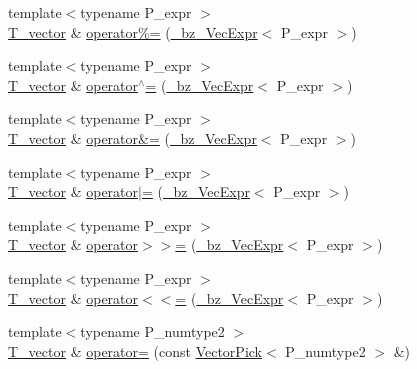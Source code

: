 \begin{DoxyCompactItemize}
{\footnotesize template$<$typename P\+\_\+expr $>$ }\\\hyperlink{classTinyVector_aea08e4463006acf6842a93c026b27094}{T\+\_\+vector} \& \hyperlink{classTinyVector_a82fe1f52954a646fb4c9a93dd740a346}{operator\%=} (\hyperlink{class__bz__VecExpr}{\+\_\+bz\+\_\+\+Vec\+Expr}$<$ P\+\_\+expr $>$)
\item 
{\footnotesize template$<$typename P\+\_\+expr $>$ }\\\hyperlink{classTinyVector_aea08e4463006acf6842a93c026b27094}{T\+\_\+vector} \& \hyperlink{classTinyVector_a3955f3ea3bf925d98a11848d46364283}{operator$^\wedge$=} (\hyperlink{class__bz__VecExpr}{\+\_\+bz\+\_\+\+Vec\+Expr}$<$ P\+\_\+expr $>$)
\item 
{\footnotesize template$<$typename P\+\_\+expr $>$ }\\\hyperlink{classTinyVector_aea08e4463006acf6842a93c026b27094}{T\+\_\+vector} \& \hyperlink{classTinyVector_a2b37419012fb9e2fe50d61363325c5ac}{operator\&=} (\hyperlink{class__bz__VecExpr}{\+\_\+bz\+\_\+\+Vec\+Expr}$<$ P\+\_\+expr $>$)
\item 
{\footnotesize template$<$typename P\+\_\+expr $>$ }\\\hyperlink{classTinyVector_aea08e4463006acf6842a93c026b27094}{T\+\_\+vector} \& \hyperlink{classTinyVector_aa39697b80db3a814bd4909d9cc67901d}{operator$\vert$=} (\hyperlink{class__bz__VecExpr}{\+\_\+bz\+\_\+\+Vec\+Expr}$<$ P\+\_\+expr $>$)
\item 
{\footnotesize template$<$typename P\+\_\+expr $>$ }\\\hyperlink{classTinyVector_aea08e4463006acf6842a93c026b27094}{T\+\_\+vector} \& \hyperlink{classTinyVector_a7da7a52109e9c05b3a5231c67e234e4f}{operator$>$$>$=} (\hyperlink{class__bz__VecExpr}{\+\_\+bz\+\_\+\+Vec\+Expr}$<$ P\+\_\+expr $>$)
\item 
{\footnotesize template$<$typename P\+\_\+expr $>$ }\\\hyperlink{classTinyVector_aea08e4463006acf6842a93c026b27094}{T\+\_\+vector} \& \hyperlink{classTinyVector_a1e85c616fde49a841fe43059136c40a2}{operator$<$$<$=} (\hyperlink{class__bz__VecExpr}{\+\_\+bz\+\_\+\+Vec\+Expr}$<$ P\+\_\+expr $>$)
\item 
{\footnotesize template$<$typename P\+\_\+numtype2 $>$ }\\\hyperlink{classTinyVector_aea08e4463006acf6842a93c026b27094}{T\+\_\+vector} \& \hyperlink{classTinyVector_aef9b01ca11916adcb0b0346b9cb55ee2}{operator=} (const \hyperlink{classVectorPick}{Vector\+Pick}$<$ P\+\_\+numtype2 $>$ \&)
\item 

\end{DoxyCompactItemize}
